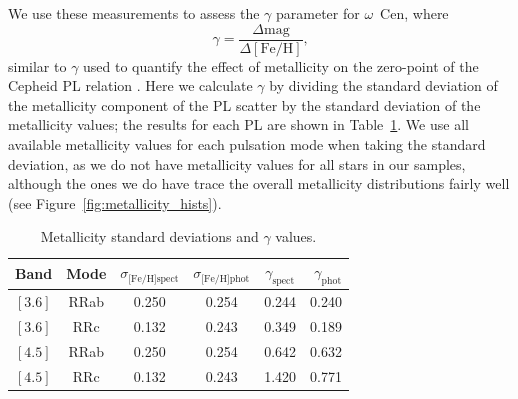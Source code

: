 We use these measurements to assess the $\gamma$ parameter for $\omega$~Cen, where 
\begin{equation} \label{eqn:gamma}
\gamma = \dfrac {\Delta \text{mag}} {\Delta [\text{Fe/H}]}\text{,}
\end{equation}
similar to $\gamma$ used to quantify the effect of metallicity on the zero-point of the Cepheid PL relation \citep{1998ApJ...498..181K, 2009MNRAS.396.1287S}. Here we calculate $\gamma$ by dividing the standard deviation of the metallicity component of the PL scatter by the standard deviation of the metallicity values; the results for each PL are shown in Table~\ref{tab:gamma}. We use all available metallicity values for each pulsation mode when taking the standard deviation, as we do not have metallicity values for all stars in our samples, although the ones we do have trace the overall metallicity distributions fairly well (see Figure~\ref{fig:metallicity_hists}).

\begin{table}
\centering
\caption{Metallicity standard deviations and $\gamma$ values.}
\label{tab:gamma}
\begin{tabular}{lccccr} 
\hline \hline
Band & Mode & $\sigma_{\text{[Fe/H]spect}}$ & $\sigma_{\text{[Fe/H]phot}}$ & $\gamma_{\text{spect}}$ & $\gamma_{\text{phot}}$ \\
\hline
$[3.6]$ & RRab & 0.250 & 0.254 & 0.244 & 0.240 \\ %
$[3.6]$ & RRc & 0.132 & 0.243 & 0.349 & 0.189 \\ %
$[4.5]$ & RRab & 0.250 & 0.254 & 0.642 & 0.632 \\ %
$[4.5]$ & RRc & 0.132 & 0.243 & 1.420 & 0.771 \\ %
\hline
\end{tabular}
\end{table}
